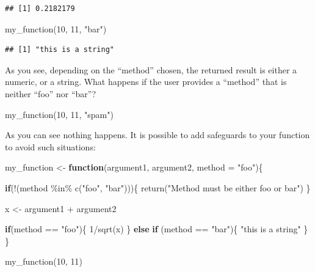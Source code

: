 \documentclass[
]{article}
\newenvironment{Shaded}{\begin{snugshade}}{\end{snugshade}}
\newcommand{\AttributeTok}[1]{\textcolor[rgb]{0.77,0.63,0.00}{#1}}
\newcommand{\ControlFlowTok}[1]{\textcolor[rgb]{0.13,0.29,0.53}{\textbf{#1}}}
\newcommand{\DecValTok}[1]{\textcolor[rgb]{0.00,0.00,0.81}{#1}}
\newcommand{\FunctionTok}[1]{\textcolor[rgb]{0.00,0.00,0.00}{#1}}
\newcommand{\NormalTok}[1]{#1}
\newcommand{\OtherTok}[1]{\textcolor[rgb]{0.56,0.35,0.01}{#1}}
\newcommand{\SpecialCharTok}[1]{\textcolor[rgb]{0.00,0.00,0.00}{#1}}
\newcommand{\StringTok}[1]{\textcolor[rgb]{0.31,0.60,0.02}{#1}}
\begin{document}
\begin{verbatim}
## [1] 0.2182179
\end{verbatim}

\begin{Shaded}
\begin{Highlighting}[]
\FunctionTok{my\_function}\NormalTok{(}\DecValTok{10}\NormalTok{, }\DecValTok{11}\NormalTok{, }\StringTok{"bar"}\NormalTok{)}
\end{Highlighting}
\end{Shaded}

\begin{verbatim}
## [1] "this is a string"
\end{verbatim}

As you see, depending on the ``method'' chosen, the returned result is either a numeric, or a string.
What happens if the user provides a ``method'' that is neither ``foo'' nor ``bar''?

\begin{Shaded}
\begin{Highlighting}[]
\FunctionTok{my\_function}\NormalTok{(}\DecValTok{10}\NormalTok{, }\DecValTok{11}\NormalTok{, }\StringTok{"spam"}\NormalTok{)}
\end{Highlighting}
\end{Shaded}

As you can see nothing happens. It is possible to add safeguards to your function to avoid such
situations:

\begin{Shaded}
\begin{Highlighting}[]
\NormalTok{my\_function }\OtherTok{\textless{}{-}} \ControlFlowTok{function}\NormalTok{(argument1, argument2, }\AttributeTok{method =} \StringTok{"foo"}\NormalTok{)\{}
  
  \ControlFlowTok{if}\NormalTok{(}\SpecialCharTok{!}\NormalTok{(method }\SpecialCharTok{\%in\%} \FunctionTok{c}\NormalTok{(}\StringTok{"foo"}\NormalTok{, }\StringTok{"bar"}\NormalTok{)))\{}
    \FunctionTok{return}\NormalTok{(}\StringTok{"Method must be either \textquotesingle{}foo\textquotesingle{} or \textquotesingle{}bar\textquotesingle{}"}\NormalTok{)}
\NormalTok{  \}}
  
\NormalTok{  x }\OtherTok{\textless{}{-}}\NormalTok{ argument1 }\SpecialCharTok{+}\NormalTok{ argument2}
  
  \ControlFlowTok{if}\NormalTok{(method }\SpecialCharTok{==} \StringTok{"foo"}\NormalTok{)\{}
    \DecValTok{1}\SpecialCharTok{/}\FunctionTok{sqrt}\NormalTok{(x)}
\NormalTok{  \} }\ControlFlowTok{else} \ControlFlowTok{if}\NormalTok{ (method }\SpecialCharTok{==} \StringTok{"bar"}\NormalTok{)\{}
    \StringTok{"this is a string"}
\NormalTok{    \}}
\NormalTok{\}}

\FunctionTok{my\_function}\NormalTok{(}\DecValTok{10}\NormalTok{, }\DecValTok{11}\NormalTok{)}
\end{Highlighting}
\end{Shaded}
\end{document}
